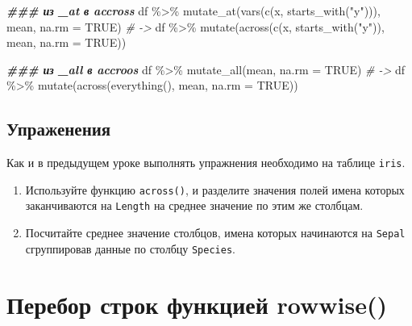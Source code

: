 \documentclass[
]{book}
\newenvironment{Shaded}{\begin{snugshade}}{\end{snugshade}}
\newcommand{\AttributeTok}[1]{\textcolor[rgb]{0.77,0.63,0.00}{#1}}
\newcommand{\CommentTok}[1]{\textcolor[rgb]{0.56,0.35,0.01}{\textit{#1}}}
\newcommand{\ConstantTok}[1]{\textcolor[rgb]{0.00,0.00,0.00}{#1}}
\newcommand{\DocumentationTok}[1]{\textcolor[rgb]{0.56,0.35,0.01}{\textbf{\textit{#1}}}}
\newcommand{\FunctionTok}[1]{\textcolor[rgb]{0.00,0.00,0.00}{#1}}
\newcommand{\NormalTok}[1]{#1}
\newcommand{\SpecialCharTok}[1]{\textcolor[rgb]{0.00,0.00,0.00}{#1}}
\newcommand{\StringTok}[1]{\textcolor[rgb]{0.31,0.60,0.02}{#1}}
\providecommand{\tightlist}{%
  \setlength{\itemsep}{0pt}\setlength{\parskip}{0pt}}
\begin{document}
\begin{Shaded}
\begin{Highlighting}[]
\DocumentationTok{\#\#\# из \_at в accross}
\NormalTok{df }\SpecialCharTok{\%\textgreater{}\%} \FunctionTok{mutate\_at}\NormalTok{(}\FunctionTok{vars}\NormalTok{(}\FunctionTok{c}\NormalTok{(x, }\FunctionTok{starts\_with}\NormalTok{(}\StringTok{"y"}\NormalTok{))), mean, }\AttributeTok{na.rm =} \ConstantTok{TRUE}\NormalTok{)}
\CommentTok{\# {-}\textgreater{}}
\NormalTok{df }\SpecialCharTok{\%\textgreater{}\%} \FunctionTok{mutate}\NormalTok{(}\FunctionTok{across}\NormalTok{(}\FunctionTok{c}\NormalTok{(x, }\FunctionTok{starts\_with}\NormalTok{(}\StringTok{"y"}\NormalTok{)), mean, }\AttributeTok{na.rm =} \ConstantTok{TRUE}\NormalTok{))}

\DocumentationTok{\#\#\# из \_all в accroos}
\NormalTok{df }\SpecialCharTok{\%\textgreater{}\%} \FunctionTok{mutate\_all}\NormalTok{(mean, }\AttributeTok{na.rm =} \ConstantTok{TRUE}\NormalTok{)}
\CommentTok{\# {-}\textgreater{}}
\NormalTok{df }\SpecialCharTok{\%\textgreater{}\%} \FunctionTok{mutate}\NormalTok{(}\FunctionTok{across}\NormalTok{(}\FunctionTok{everything}\NormalTok{(), mean, }\AttributeTok{na.rm =} \ConstantTok{TRUE}\NormalTok{))}
\end{Highlighting}
\end{Shaded}

\hypertarget{ux443ux43fux440ux430ux436ux435ux43dux435ux43dux438ux44f}{%
\section{Упраженения}\label{ux443ux43fux440ux430ux436ux435ux43dux435ux43dux438ux44f}}

Как и в предыдущем уроке выполнять упражнения необходимо на таблице \texttt{iris}.

\begin{enumerate}
\def\labelenumi{\arabic{enumi}.}
\tightlist
\item
  Используйте функцию \texttt{across()}, и разделите значения полей имена которых заканчиваются на \texttt{Length} на среднее значение по этим же столбцам.
\item
  Посчитайте среднее значение столбцов, имена которых начинаются на \texttt{Sepal} сгруппировав данные по столбцу \texttt{Species}.
\end{enumerate}

\hypertarget{ux43fux435ux440ux435ux431ux43eux440-ux441ux442ux440ux43eux43a-ux444ux443ux43dux43aux446ux438ux435ux439-rowwise}{%
\chapter{Перебор строк функцией rowwise()}\label{ux43fux435ux440ux435ux431ux43eux440-ux441ux442ux440ux43eux43a-ux444ux443ux43dux43aux446ux438ux435ux439-rowwise}}
\end{document}
